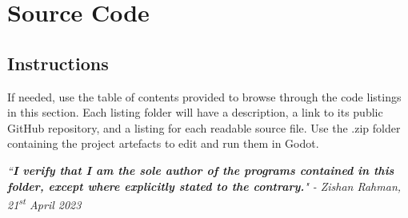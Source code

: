 \chapter{Source Code} \label{Code}

\localtableofcontents{}

\section{Instructions}



If needed, use the table of contents provided to browse through the code listings in this section. Each listing folder will have a description, a link to its public GitHub repository, and a listing for each readable source file. Use the .zip folder containing the project artefacts to edit and run them in Godot.

\textit{``\textbf{I verify that I am the sole author of the programs contained in this folder, except where explicitly stated to the contrary.}"}
\textit{- Zishan Rahman, 21\textsuperscript{st} April 2023}

